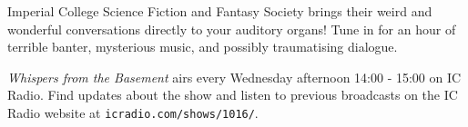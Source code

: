 
Imperial College Science Fiction and Fantasy Society brings their
weird and wonderful conversations directly to your auditory organs!
Tune in for an hour of terrible banter, mysterious music, and possibly
traumatising dialogue.

\textit{Whispers from the Basement} airs every Wednesday afternoon
14:00 - 15:00 on IC Radio. Find updates about the show and listen to
previous broadcasts on the IC Radio website
at \texttt{icradio.com/shows/1016/}.
\par
